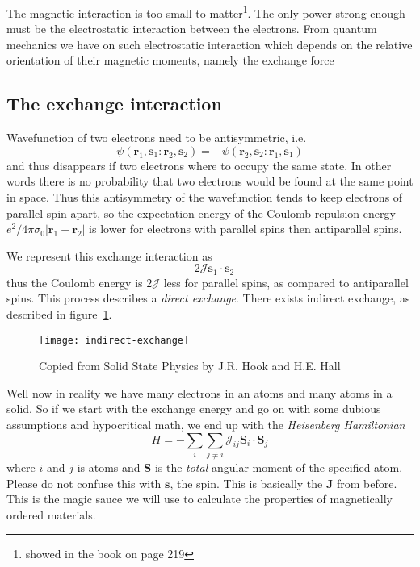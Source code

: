 \documentclass[11pt]{article}
\begin{document}
The magnetic interaction is too small to matter\footnote{showed in the book on page 219}. The only power strong enough must be the electrostatic interaction between the electrons. From quantum mechanics we have on such electrostatic interaction which depends on the relative orientation of their magnetic moments, namely the exchange force
\subsection{The exchange interaction}
Wavefunction of two electrons need to be antisymmetric, i.e.
\begin{equation}
	\psi(\pmb{r}_1, \pmb{s}_1:\pmb{r}_2, \pmb{s}_2) = -  \psi(\pmb{r}_2, \pmb{s}_2:\pmb{r}_1, \pmb{s}_1)
\end{equation}
and thus disappears if two electrons where  to occupy the same state. In other words there is no probability that two electrons would be found at the same point in space. Thus this antisymmetry of the wavefunction tends to keep electrons of parallel spin apart, so the expectation energy of the Coulomb repulsion energy $e^2/4\pi \sigma_0 |\pmb{r}_1 - \pmb{r}_2 |$ is lower for electrons with parallel spins then antiparallel spins. 

We represent this exchange interaction as
\begin{equation}
	-2 \mathscr{J} \pmb{s}_1 \cdot \pmb{s}_2
\end{equation}
thus the Coulomb energy is $2\mathscr{J}$ less for parallel spins, as compared to antiparallel spins. This process describes a \emph{direct exchange}. There exists indirect exchange, as described in figure~\ref{fig:indirect-exchange}.
\begin{figure}[!ht]
	\centering
	\texttt{[image: indirect-exchange]}
	\caption{Copied from Solid State Physics by J.R. Hook and H.E. Hall}
	\label{fig:indirect-exchange}
\end{figure}

Well now in reality we have many electrons in an atoms and many atoms in a solid. So if we start with the exchange energy and go on with some dubious assumptions and hypocritical math, we end up with the \emph{Heisenberg Hamiltonian} 
\begin{equation}
	H = - \sum_i \sum_{j \neq i} \mathscr{J}_{ij} \pmb{S}_i \cdot \pmb{S}_j
	\label{eq:heisenberg-hamiltonian}
\end{equation}
where $i$ and $j$ is atoms and $\pmb{S}$ is the \emph{total} angular moment of the specified atom. Please do not confuse this with $\pmb{s}$, the spin. This is basically the $\pmb{J}$ from before. This is the magic sauce we will use to calculate the properties of magnetically ordered materials.
\end{document}
